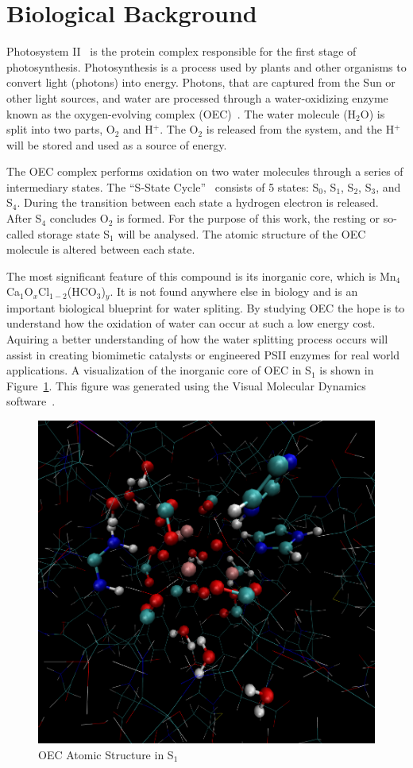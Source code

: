 \section{Biological Background}

Photosystem II~\cite{oxygenicPhotosynthesis} is the protein complex responsible for the first stage of photosynthesis. Photosynthesis is a process used by plants and other organisms to convert light (photons) into energy. Photons, that are captured from the Sun or other light sources, and water are processed through a water-oxidizing enzyme known as the oxygen-evolving complex (OEC)~\cite{yano2006manganese}. The water molecule (H$_{2}$O) is split into two parts, O$_{2}$ and H$^{+}$. The O$_{2}$ is released from the system, and the H$^{+}$ will be stored and used as a source of energy.

The OEC complex performs oxidation on two water molecules through a series of intermediary states. The ``S-State Cycle''~\cite{yano2006manganese} consists of 5 states: S$_{0}$, S$_{1}$, S$_{2}$, S$_{3}$, and S$_{4}$. During the transition between each state a hydrogen electron is released. After S$_{4}$ concludes O$_{2}$ is formed. For the purpose of this work, the resting or so-called storage state S$_{1}$ will be analysed. The atomic structure of the OEC molecule is altered between each state.

The most significant feature of this compound is its inorganic core, which is \linebreak Mn$_{4}$Ca$_{1}$O$_{x}$Cl$_{1-2}$(HCO$_{3}$)$_{y}$. It is not found anywhere else in biology and is an important biological blueprint for water spliting. By studying OEC the hope is to understand how the oxidation of water can occur at such a low energy cost. Aquiring a better understanding of how the water splitting process occurs will assist in creating biomimetic catalysts or engineered PSII enzymes for real world applications. A visualization of the inorganic core of OEC in S$_{1}$ is shown in Figure~\ref{fig:oec-in-s1}. This figure was generated using the Visual Molecular Dynamics software~\cite{vmd}.

\begin{figure}[H]
	\centering
	\includegraphics[bb=0 0 941 901,scale=0.3]{figures/structure.png}
	\caption{OEC Atomic Structure in S$_{1}$}
	\label{fig:oec-in-s1}
\end{figure}